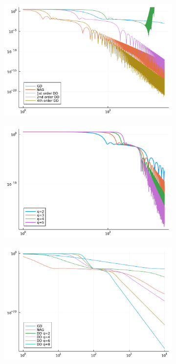\begin{figure}[htbp]
    \begin{subfigure}{0.45\textwidth}
        \includegraphics[width=\textwidth]{"assets/quadratic-1.pdf"}
        \caption{}
        \label{fig:l2-1}
    \end{subfigure}
    \hfill
    \begin{subfigure}{0.45\textwidth}
        \includegraphics[width=\textwidth]{"assets/quadratic-2.pdf"}
        \caption{}
        \label{fig:l2-2}
    \end{subfigure}
    \hfill
    \begin{subfigure}{0.45\textwidth}
        \includegraphics[width=\textwidth]{"assets/l4loss.pdf"}

\end{subfigure}
\end{figure}
